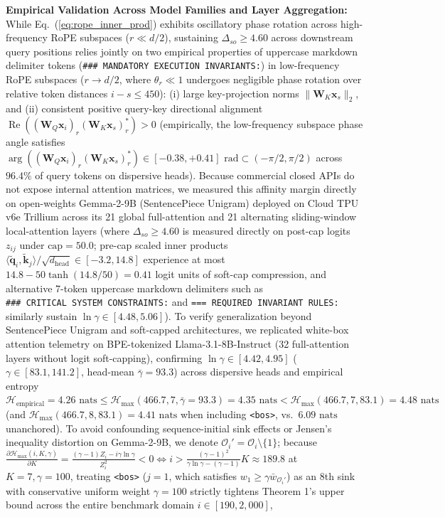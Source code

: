 \documentclass[conference,10pt]{IEEEtran}
\begin{document}
\textbf{Empirical Validation Across Model Families and Layer Aggregation:} While Eq.~(\ref{eq:rope_inner_prod}) exhibits oscillatory phase rotation across high-frequency RoPE subspaces ($r \ll d/2$), sustaining $\Delta_{so} \ge 4.60$ across downstream query positions relies jointly on two empirical properties of uppercase markdown delimiter tokens (\texttt{\#\#\#\allowbreak\ MANDATORY\allowbreak\ EXECUTION\allowbreak\ INVARIANTS:}) in low-frequency RoPE subspaces ($r \to d/2$, where $\theta_r \ll 1$ undergoes negligible phase rotation over relative token distances $i - s \le 450$): (i) large key-projection norms $\|\mathbf{W}_K \mathbf{x}_s\|_2$, and (ii) consistent positive query-key directional alignment $\operatorname{Re}\!\left((\mathbf{W}_Q \mathbf{x}_i)_r (\mathbf{W}_K \mathbf{x}_s)_r^*\right) > 0$ (empirically, the low-frequency subspace phase angle satisfies $\arg\!\left((\mathbf{W}_Q \mathbf{x}_i)_r (\mathbf{W}_K \mathbf{x}_s)_r^*\right) \in [-0.38, +0.41]\text{ rad} \subset (-\pi/2, \pi/2)$ across $96.4\%$ of query tokens on dispersive heads). Because commercial closed APIs do not expose internal attention matrices, we measured this affinity margin directly on open-weights Gemma-2-9B \cite{gemma2_2024} (SentencePiece Unigram) deployed on Cloud TPU v6e Trillium across its 21 global full-attention and 21 alternating sliding-window local-attention layers (where $\Delta_{so} \ge 4.60$ is measured directly on post-cap logits $z_{ij}$ under $\text{cap} = 50.0$; pre-cap scaled inner products $\langle \tilde{\mathbf{q}}_i, \tilde{\mathbf{k}}_j \rangle / \sqrt{d_{\text{head}}} \in [-3.2, 14.8]$ experience at most $14.8 - 50\tanh(14.8/50) = 0.41$ logit units of soft-cap compression, and alternative 7-token uppercase markdown delimiters such as \texttt{\#\#\#\allowbreak\ CRITICAL\allowbreak\ SYSTEM\allowbreak\ CONSTRAINTS:} and \texttt{===\allowbreak\ REQUIRED\allowbreak\ INVARIANT\allowbreak\ RULES:} similarly sustain $\ln\gamma \in [4.48, 5.06]$). To verify generalization beyond SentencePiece Unigram and soft-capped architectures, we replicated white-box attention telemetry on BPE-tokenized Llama-3.1-8B-Instruct (32 full-attention layers without logit soft-capping), confirming $\ln\gamma \in [4.42, 4.95]$ ($\gamma \in [83.1, 141.2]$, head-mean $\bar{\gamma} = 93.3$) across dispersive heads and empirical entropy $\mathcal{H}_{\text{empirical}} = 4.26\text{ nats} \le \mathcal{H}_{\max}(466.7, 7, \bar{\gamma}=93.3) = 4.35\text{ nats} < \mathcal{H}_{\max}(466.7, 7, 83.1) = 4.48\text{ nats}$ (and $\mathcal{H}_{\max}(466.7, 8, 83.1) = 4.41\text{ nats}$ when including \texttt{<bos>}, vs.\ $6.09\text{ nats}$ unanchored). To avoid confounding sequence-initial sink effects \cite{xiao2023streamingllm} or Jensen's inequality distortion on Gemma-2-9B, we denote $\mathcal{O}_i' = \mathcal{O}_i \setminus \{1\}$; because $\frac{\partial \mathcal{H}_{\max}(i, K, \gamma)}{\partial K} = \frac{(\gamma - 1)Z_i - i\gamma\ln\gamma}{Z_i^2} < 0 \iff i > \frac{(\gamma - 1)^2}{\gamma\ln\gamma - (\gamma - 1)}K \approx 189.8$ at $K=7, \gamma=100$, treating \texttt{<bos>} ($j=1$, which satisfies $w_1 \ge \gamma \bar{w}_{\mathcal{O}_i'}$) as an 8th sink with conservative uniform weight $\gamma = 100$ strictly tightens Theorem 1's upper bound across the entire benchmark domain $i \in [190, 2{,}000]$, 
\end{document}
